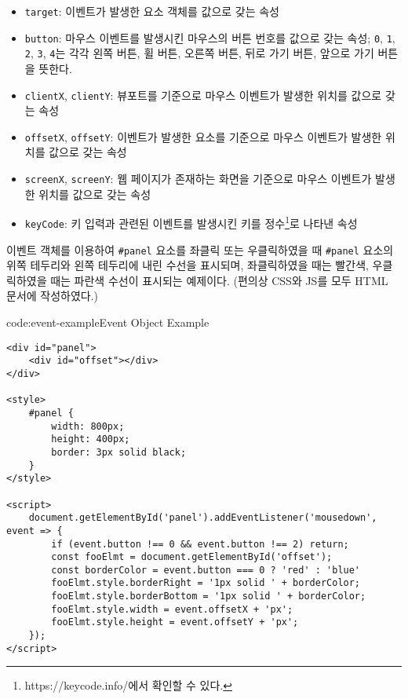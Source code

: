 \begin{itemize}
    \item \texttt{target}: 이벤트가 발생한 요소 객체를 값으로 갖는 속성
    \item \texttt{button}: 마우스 이벤트를 발생시킨 마우스의 버튼 번호를 값으로 갖는 속성; \texttt{0}, \texttt{1}, \texttt{2}, \texttt{3}, \texttt{4}는 각각 왼쪽 버튼, 휠 버튼, 오른쪽 버튼, 뒤로 가기 버튼, 앞으로 가기 버튼을 뜻한다.
    \item \texttt{clientX}, \texttt{clientY}: 뷰포트를 기준으로 마우스 이벤트가 발생한 위치를 값으로 갖는 속성
    \item \texttt{offsetX}, \texttt{offsetY}: 이벤트가 발생한 요소를 기준으로 마우스 이벤트가 발생한 위치를 값으로 갖는 속성
    \item \texttt{screenX}, \texttt{screenY}: 웹 페이지가 존재하는 화면을 기준으로 마우스 이벤트가 발생한 위치를 값으로 갖는 속성
    \item \texttt{keyCode}: 키 입력과 관련된 이벤트를 발생시킨 키를 정수\footnote{https://keycode.info/에서 확인할 수 있다.}로 나타낸 속성
\end{itemize}

\은 이벤트 객체를 이용하여 \texttt{\#panel} 요소를 좌클릭 또는 우클릭하였을 때 \texttt{\#panel} 요소의 위쪽 테두리와 왼쪽 테두리에 내린 수선을 표시되며, 좌클릭하였을 때는 빨간색, 우클릭하였을 때는 파란색 수선이 표시되는 예제이다. (편의상 CSS와 JS를 모두 HTML 문서에 작성하였다.)

\begin{codeenv}{code:event-example}{Event Object Example}\begin{verbatim}
<div id="panel">
    <div id="offset"></div>
</div>

<style>
    #panel {
        width: 800px;
        height: 400px;
        border: 3px solid black;
    }
</style>

<script>
    document.getElementById('panel').addEventListener('mousedown', event => {
        if (event.button !== 0 && event.button !== 2) return;
        const fooElmt = document.getElementById('offset');
        const borderColor = event.button === 0 ? 'red' : 'blue'
        fooElmt.style.borderRight = '1px solid ' + borderColor;
        fooElmt.style.borderBottom = '1px solid ' + borderColor;
        fooElmt.style.width = event.offsetX + 'px';
        fooElmt.style.height = event.offsetY + 'px';
    });
</script>
\end{verbatim}
\end{codeenv}
